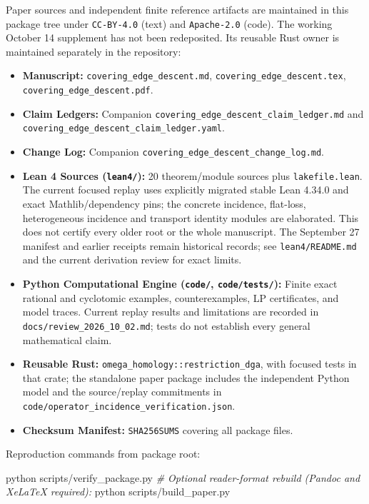 \documentclass[
  english,
  10pt,
  a4paper,
]{article}
\newenvironment{Shaded}{}{}
\newcommand{\CommentTok}[1]{\textcolor[rgb]{0.38,0.63,0.69}{\textit{#1}}}
\newcommand{\ExtensionTok}[1]{#1}
\newcommand{\NormalTok}[1]{#1}
\providecommand{\tightlist}{%
  \setlength{\itemsep}{0pt}\setlength{\parskip}{0pt}}
\providecommand{\tightlist}{%
  \setlength{\itemsep}{0pt}\setlength{\parskip}{0pt}}
\begin{document}
Paper sources and independent finite reference artifacts are maintained
in this package tree under \texttt{CC-BY-4.0} (text) and
\texttt{Apache-2.0} (code). The working October 14 supplement has not
been redeposited. Its reusable Rust owner is maintained separately in
the repository:

\begin{itemize}
\tightlist
\item
  \textbf{Manuscript:} \texttt{covering\_edge\_descent.md},
  \nolinkurl{covering_edge_descent.tex},
  \nolinkurl{covering_edge_descent.pdf}.
\item
  \textbf{Claim Ledgers:} Companion
  \nolinkurl{covering_edge_descent_claim_ledger.md} and
  \nolinkurl{covering_edge_descent_claim_ledger.yaml}.
\item
  \textbf{Change Log:} Companion
  \nolinkurl{covering_edge_descent_change_log.md}.
\item
  \textbf{Lean 4 Sources (\texttt{lean4/}):} 20 theorem/module sources
  plus \texttt{lakefile.lean}. The current focused replay uses
  explicitly migrated stable Lean 4.34.0 and exact Mathlib/dependency
  pins; the concrete incidence, flat-loss, heterogeneous incidence and
  transport identity modules are elaborated. This does not certify every
  older root or the whole manuscript. The September 27 manifest and
  earlier receipts remain historical records; see
  \texttt{lean4/README.md} and the current derivation review for exact
  limits.
\item
  \textbf{Python Computational Engine (\texttt{code/},
  \texttt{code/tests/}):} Finite exact rational and cyclotomic examples,
  counterexamples, LP certificates, and model traces. Current replay
  results and limitations are recorded in
  \nolinkurl{docs/review_2026_10_02.md}; tests do not establish every
  general mathematical claim.
\item
  \textbf{Reusable Rust:} \nolinkurl{omega_homology::restriction_dga},
  with focused tests in that crate; the standalone paper package
  includes the independent Python model and the source/replay
  commitments in \nolinkurl{code/operator_incidence_verification.json}.
\item
  \textbf{Checksum Manifest:} \texttt{SHA256SUMS} covering all package
  files.
\end{itemize}

Reproduction commands from package root:

\begin{Shaded}
\begin{Highlighting}[]
\ExtensionTok{python}\NormalTok{ scripts/verify\_package.py}
\CommentTok{\# Optional reader{-}format rebuild (Pandoc and XeLaTeX required):}
\ExtensionTok{python}\NormalTok{ scripts/build\_paper.py}
\end{Highlighting}
\end{Shaded}
\end{document}

